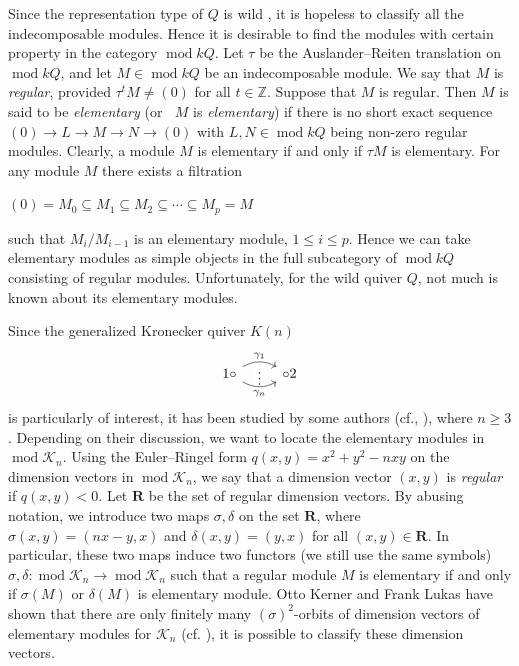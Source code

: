 \documentclass[a4paper,12pt]{amsart}
\newcommand{\cK}{\mathcal{K}}
\DeclareMathOperator{\modd}{mod}
\DeclareMathOperator{\dimu}{\underline{dim}}
\begin{document}
 Since the representation type of $Q$ is wild \cite[1.3]{Kerner}, it is hopeless to classify all the indecomposable modules. Hence it is desirable to find the modules with certain property in the category $\modd kQ$. Let $\tau$ be the Auslander--Reiten translation on $\modd kQ$, and let $M\in \modd kQ$ be an indecomposable module. We  say that $M$ is \textit{regular}, provided $\tau^t M\neq (0)$ for all $t\in \mathbb{Z}$.   Suppose that $M$ is regular.  Then  $M$ is said to be \textit{elementary} (or $\dimu M$ is \textit{elementary}) if there is no short exact sequence $(0)\rightarrow L\rightarrow M\rightarrow N\rightarrow (0)$ with $L,N\in\modd kQ$ being non-zero regular
 modules. Clearly, a module $M$ is elementary if and only if $\tau M$
 is elementary. For any module $M$ there exists a filtration 
 \begin{center}
   $(0)=M_0\subseteq M_1 \subseteq M_2\subseteq \cdots \subseteq M_p=M$
 \end{center}
such that $M_i/M_{i-1}$ is an elementary module, $1 \leq i\leq p$. Hence we can take elementary modules as simple objects in the full subcategory of $\modd kQ$ consisting of regular modules.  Unfortunately, for the wild quiver $Q$, not much is known about its elementary modules. 
 
 
 Since the  generalized  Kronecker quiver $K(n)$
 \[
\begin{tikzcd}
    1 \circ
  \arrow[r, draw=none, "{\vdots}" description]
    \arrow[r, bend left,        "\gamma_1"]
    \arrow[r, bend right, swap, "\gamma_n"]
    &
    \circ 2 
\end{tikzcd}
\]
is particularly of interest, it has been studied by some authors (cf.\cite{Claus2}, \cite{Daniel2}), where $n\geq 3$. Depending on their discussion, we want to locate the elementary modules in $\modd\cK_n$. Using the Euler--Ringel form   $q(x,y)=x^2+y^2-nxy$  on the dimension vectors in $\modd \cK_n$, we say that  a dimension vector  $(x,y)$ is  \textit{regular}  if $q(x,y)<0$. Let $\mathbf{R}$ be the set of regular dimension vectors. By abusing notation, we introduce two maps  $\sigma, \delta$ on the set $\mathbf{R}$,  where $\sigma(x,y)=(nx-y,x)$ and $\delta(x,y)=(y,x)$ for all $ (x,y)\in \mathbf{R}$.  In particular, these two maps induce two functors (we still use the same symbols) $\sigma, \delta:\modd \cK_n\rightarrow \modd \cK_n$ such that a regular module $M$ is elementary if and only if  $\sigma (M)$ or $\delta(M)$ is elementary module. Otto Kerner and Frank Lukas have shown that there are only finitely many   $(\sigma)^2$-orbits of dimension vectors of elementary modules for $\mathcal{K}_n$ (cf. \cite{Otto}),  it is possible to classify these  dimension vectors. 
 
\end{document}
